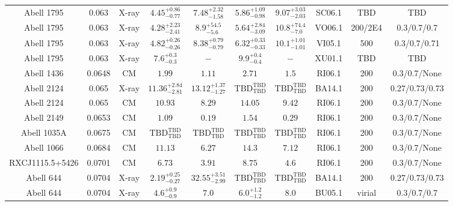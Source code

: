 \begin{table}
\begin{tabular}{cccccccccc}
Abell 1795 & 0.063 & X-ray & ${4.45}^{+0.86}_{-0.77}$ & ${7.48}^{+2.32}_{-1.58}$ & ${5.86}^{+1.09}_{-0.98}$ & ${9.07}^{+3.03}_{-2.03}$ & SC06.1 & TBD & TBD \\
Abell 1795 & 0.063 & X-ray & ${4.28}^{+2.23}_{-2.41}$ & ${8.9}^{+54.5}_{-5.6}$ & ${5.64}^{+2.84}_{-3.09}$ & ${10.8}^{+74.4}_{-7.0}$ & VO06.1 & 200/2E4 & 0.3/0.7/0.7 \\
Abell 1795 & 0.063 & X-ray & ${4.82}^{+0.26}_{-0.26}$ & ${8.38}^{+0.79}_{-0.79}$ & ${6.32}^{+0.33}_{-0.33}$ & ${10.1}^{+1.01}_{-1.01}$ & VI05.1 & 500 & 0.3/0.7/0.71 \\
Abell 1795 & 0.063 & X-ray & ${7.6}^{+0.3}_{-0.3}$ & ${-}^{}_{}$ & ${9.9}^{+0.4}_{-0.4}$ & ${-}^{}_{}$ & XU01.1 & TBD & TBD \\
Abell 1436 & 0.0648 & CM & ${1.99}^{}_{}$ & ${1.11}^{}_{}$ & ${2.71}^{}_{}$ & ${1.5}^{}_{}$ & RI06.1 & 200 & 0.3/0.7/None \\
Abell 2124 & 0.065 & X-ray & ${11.36}^{+2.84}_{-2.81}$ & ${13.12}^{+1.37}_{-1.27}$ & ${\mathrm{TBD}}^{\mathrm{TBD}}_{\mathrm{TBD}}$ & ${\mathrm{TBD}}^{\mathrm{TBD}}_{\mathrm{TBD}}$ & BA14.1 & 200 & 0.27/0.73/0.73 \\
Abell 2124 & 0.065 & CM & ${10.93}^{}_{}$ & ${8.29}^{}_{}$ & ${14.05}^{}_{}$ & ${9.42}^{}_{}$ & RI06.1 & 200 & 0.3/0.7/None \\
Abell 2149 & 0.0653 & CM & ${1.09}^{}_{}$ & ${0.19}^{}_{}$ & ${1.54}^{}_{}$ & ${0.29}^{}_{}$ & RI06.1 & 200 & 0.3/0.7/None \\
Abell 1035A & 0.0675 & CM & ${\mathrm{TBD}}^{\mathrm{TBD}}_{\mathrm{TBD}}$ & ${\mathrm{TBD}}^{\mathrm{TBD}}_{\mathrm{TBD}}$ & ${\mathrm{TBD}}^{\mathrm{TBD}}_{\mathrm{TBD}}$ & ${\mathrm{TBD}}^{\mathrm{TBD}}_{\mathrm{TBD}}$ & RI06.1 & 200 & 0.3/0.7/None \\
Abell 1066 & 0.0684 & CM & ${11.13}^{}_{}$ & ${6.27}^{}_{}$ & ${14.3}^{}_{}$ & ${7.12}^{}_{}$ & RI06.1 & 200 & 0.3/0.7/None \\
RXCJ1115.5+5426 & 0.0701 & CM & ${6.73}^{}_{}$ & ${3.91}^{}_{}$ & ${8.75}^{}_{}$ & ${4.6}^{}_{}$ & RI06.1 & 200 & 0.3/0.7/None \\
Abell 644 & 0.0704 & X-ray & ${2.19}^{+0.25}_{-0.27}$ & ${32.55}^{+3.51}_{-2.99}$ & ${\mathrm{TBD}}^{\mathrm{TBD}}_{\mathrm{TBD}}$ & ${\mathrm{TBD}}^{\mathrm{TBD}}_{\mathrm{TBD}}$ & BA14.1 & 200 & 0.27/0.73/0.73 \\
Abell 644 & 0.0704 & X-ray & ${4.6}^{+0.9}_{-0.9}$ & ${7.0}^{}_{}$ & ${6.0}^{+1.2}_{-1.2}$ & ${8.0}^{}_{}$ & BU05.1 & virial & 0.3/0.7/0.7 \\

\end{tabular}
\end{table}
